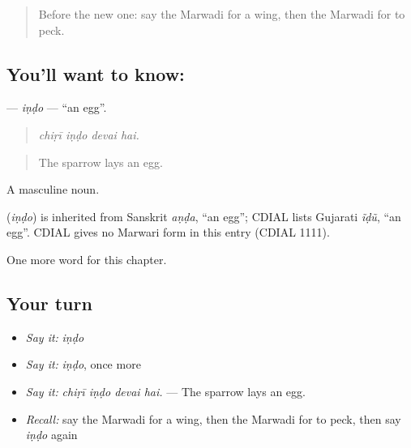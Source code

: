 \label{lesson:MW-C237-indo}



\begin{quote}
Before the new one: say the Marwadi for a wing, then the Marwadi for to peck.
\end{quote}

\subsection*{You'll want to know: }
\textbf{} — \emph{iṇḍo} — \textquotedblleft{}an egg\textquotedblright{}.

\begin{quote}
   
\end{quote}

\begin{quote}
\emph{chiṛī iṇḍo devai hai.}
\end{quote}

\begin{quote}
The sparrow lays an egg.
\end{quote}

A masculine noun.

\begin{cousinweb}
\textbf{} (\emph{iṇḍo}) is inherited from Sanskrit \emph{aṇḍa}, \textquotedblleft{}an egg\textquotedblright{}; CDIAL lists Gujarati \emph{ĩḍũ}, \textquotedblleft{}an egg\textquotedblright{}. CDIAL gives no Marwari form in this entry (CDIAL 1111).
\end{cousinweb}

\begin{grammarlens}[title={What you've built}]
One more word for this chapter.
\end{grammarlens}

\subsection*{Your turn}
\begin{itemize}
\raggedright
  \item \emph{Say it:} \emph{iṇḍo}
  \item \emph{Say it:} \emph{iṇḍo}, once more
  \item \emph{Say it:} \emph{chiṛī iṇḍo devai hai.} — The sparrow lays an egg.
  \item \emph{Recall:} say the Marwadi for a wing, then the Marwadi for to peck, then say \emph{iṇḍo} again
\end{itemize}

